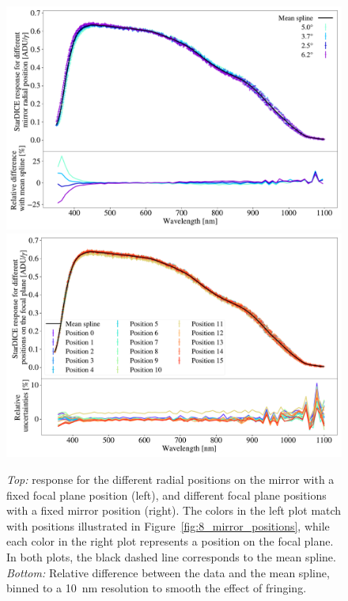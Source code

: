 \begin{figure}[h!]
    \centering
    \includegraphics[width=\columnwidth]{fig/radial_positions.pdf}
    \includegraphics[width=\columnwidth]{fig/ccd_positions.pdf}
    \caption{\textit{Top:} \SD response for the different radial positions on the mirror with a fixed focal plane position (left), and different focal plane positions with a fixed mirror position (right). The colors in the left plot match with positions illustrated in Figure~\ref{fig:8_mirror_positions}, while each color in the right plot represents a position on the focal plane. In both plots, the black dashed line corresponds to the mean spline. \textit{Bottom:} Relative difference between the data and the mean spline, binned to a \SI{10}{\nano\meter} resolution to smooth the effect of fringing.}
    \label{fig:radial_positions}
\end{figure}

